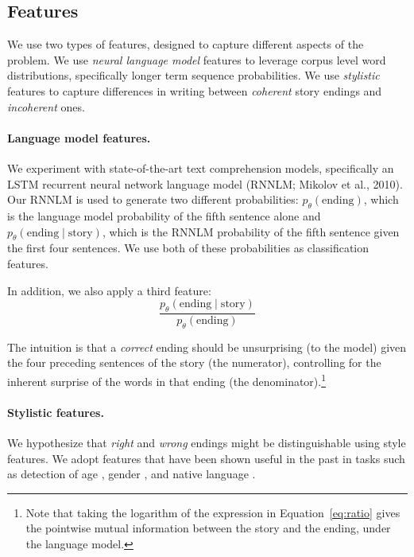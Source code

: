 \documentclass[11pt]{article}
\begin{document}
\subsection{Features}
We use two types of features, designed to capture different aspects of the problem. 
We use \textit{neural language model} features to leverage corpus level word distributions, specifically longer term sequence probabilities.
We use \textit{stylistic} features to capture differences in writing between {\it coherent} story endings and {\it incoherent} ones. 


\paragraph{Language model features.}
We experiment with state-of-the-art text comprehension models,
specifically an LSTM \cite{hochreiter1997long} recurrent neural
network language model (RNNLM; \nocite{mikolov2010recurrent}Mikolov et
al., 2010).
Our RNNLM is used to generate two different probabilities:
$p_\theta(\textrm{ending})$, which is the language model probability of the fifth sentence alone and $p_\theta(\textrm{ending} \mid \textrm{story})$, which is the RNNLM probability of the fifth sentence given the first four sentences.  
We use both of these probabilities as classification features.

In addition, we also apply a third feature:
\begin{equation}
\frac{p_\theta(\textrm{ending} \mid
  \textrm{story})}{p_\theta(\textrm{ending})} \label{eq:ratio}
\end{equation}

The intuition is that a \emph{correct} ending should be unsurprising (to the model) given the four preceding sentences of the story (the numerator), controlling for the inherent surprise of the words in that ending (the denominator).\footnote{Note that taking the logarithm of
the expression in Equation~\ref{eq:ratio} gives the pointwise mutual information between the story and the ending, under the language model.}

\paragraph{Stylistic features.}
We hypothesize that {\it right} and {\it wrong} endings might be distinguishable using style features.
We adopt features that have been shown useful in the past in tasks such as detection of age \cite{Schler:2006,Rosenthal:2011,nguyen:2011:latech}, gender  \cite{Argamon:2003,Schler:2006,bamman2014gender}, and native language
\cite{Koppel:2005,Tsur:2007,Bergsma:2012}.
\end{document}
